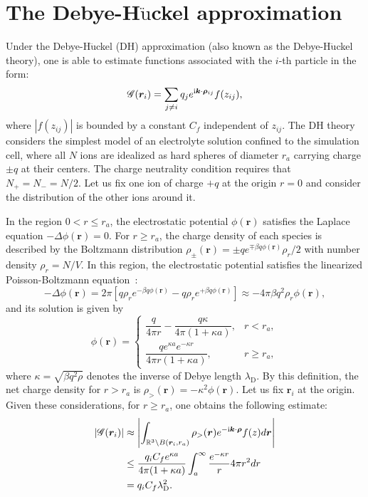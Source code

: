 \section{The Debye-H$\ddot{\text{u}}$ckel approximation}\label{app::Debye}
Under the Debye-H$\ddot{\text{u}}$ckel (DH) approximation (also known as the Debye-H$\ddot{\text{u}}$ckel theory), one is able to estimate functions associated with the $i$-th particle in the form:
\begin{equation}
	\mathscr{G}(\bm{r}_i)=\sum_{j\neq i}q_{j}e^{\mathrm{i} \bm{k}\cdot\bm{\rho}_{ij}}f(z_{ij}),
\end{equation}
where $|f(z_{ij})|$ is bounded by a constant $C_f$ independent of $z_{ij}$. The DH theory considers the simplest model of an electrolyte solution confined to the simulation cell, where all $N$ ions are idealized as hard spheres of diameter $r_{a}$ carrying charge $\pm q$ at their centers. The charge neutrality condition requires that $N_+=N_-=N/2$. Let us fix one ion of charge $+q$ at the origin $r=0$ and consider the distribution of the other ions around it.

In the region $0<r\leq r_{a}$, the electrostatic potential $\phi(\bm{r})$ satisfies the Laplace equation $-\Delta\phi(\bm{r})=0$. For $r\geq r_{a}$, the charge density of each species is described by the Boltzmann distribution $\rho_{\pm}(\bm{r})=\pm qe^{\mp\beta q\phi(\bm{r})}\rho_r/2$ with number density $\rho_r=N/V$. In this region, the electrostatic potential satisfies the linearized Poisson-Boltzmann equation~\cite{levin2002electrostatic}:
\begin{equation}
	-\Delta \phi(\bm{r})=2\pi\left[q \rho_r e^{-\beta q\phi(\bm{r})}-q\rho_r e^{+\beta q\phi(\bm{r})}\right]\approx -4\pi \beta q^2\rho_r\phi(\bm{r}),
\end{equation}
and its solution is given by
\begin{equation}
	\phi(\bm{r})=\begin{cases}
		\dfrac{q}{4\pi r}-\dfrac{q\kappa}{4\pi (1+\kappa a)},& r<r_{a},\\[1em]
		\dfrac{qe^{\kappa a}e^{-\kappa r}}{4\pi r(1+\kappa a)},&r\geq r_{a},
	\end{cases}
\end{equation}
where $\kappa=\sqrt{\beta q^2\rho}$ denotes the inverse of Debye length $\lambda_{\text{D}}$. By this definition, the net charge density for $r>r_{a}$ is $\rho_>(\bm{r})=-\kappa^2\phi(\bm{r})$. Let us fix $\bm{r}_i$ at the origin. Given these considerations, for $r\geq r_a$, one obtains the following estimate:
\begin{equation}\label{eq::E.4}
	\begin{split}
		|\mathscr{G}(\bm{r}_i)|&\approx \left|\int_{\mathbb{R}^3\backslash B(\bm{r}_{i}, r_a)}\rho_>(\bm{r})e^{-\mathrm{i} \bm{k}\cdot\bm{\rho}}f(z)d\bm{r}\right|\\
		&\leq \frac{q_iC_fe^{\kappa a}}{4\pi(1+\kappa a)}\int_{a}^{\infty}\frac{e^{-\kappa r}}{r}4\pi r^2dr\\
		&=q_iC_f\lambda_{\text{D}}^2.
	\end{split}
\end{equation}

